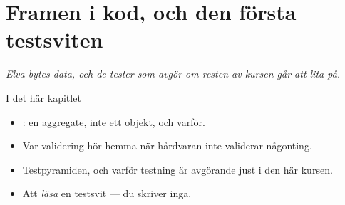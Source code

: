 \chapter{Framen i kod, och den första testsviten}
\label{ch:frameklassen}


{\large\itshape Elva bytes data, och de tester som avgör om resten av kursen går att lita på.\par}

\begin{chapterbox}{I det här kapitlet}
\begin{itemize}
  \item {}: en aggregate, inte ett objekt, och varför.
  \item Var validering hör hemma när hårdvaran inte validerar någonting.
  \item Testpyramiden, och varför testning är avgörande just i den här kursen.
  \item Att \emph{läsa} en testsvit --- du skriver inga.
\end{itemize}
\end{chapterbox}





